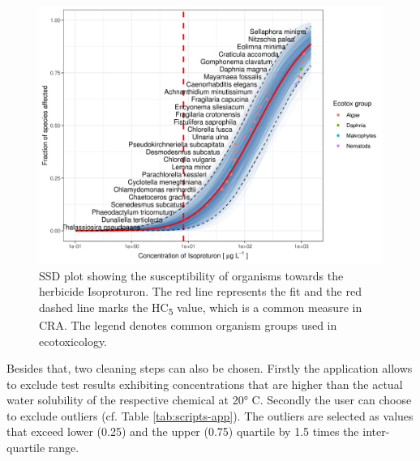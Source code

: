 \begin{figure}[h!]
    \includegraphics[width=1\linewidth]{article/figures/ssd2_boot.png}
    \caption{SSD plot showing the susceptibility of organisms towards the herbicide Isoproturon. The red line represents the fit and the red dashed line marks the HC\textsubscript{5} value, which is a common measure in CRA. The legend denotes common organism groups used in ecotoxicology.}
    \label{fig:ssd-isoproturon}
\end{figure}

Besides that, two cleaning steps can also be chosen. Firstly the application allows to exclude test results exhibiting concentrations that are higher than the actual water solubility of the respective chemical at \ang{20} C. Secondly the user can choose to exclude outliers (cf. Table \ref{tab:scripts-app}). The outliers are selected as values that exceed lower (0.25) and the upper (0.75) quartile by 1.5 times the inter-quartile range.

